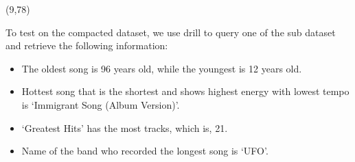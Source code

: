 \documentclass[hyperref={pdfpagelabels=false}]{beamer}
\begin{document}
\begin{frame}


\begin{textblock}{40}(9,78)
	\begin{basebox}[title=Basic Data Analysis,opacitybacktitle=.45,colframe=green!65!black,colbacktitle=green!10, halign title=left]
		To test on the compacted dataset, we use drill to query one of the sub dataset and retrieve the following information: 
		\vspace{0.3 cm}
		\begin{itemize}
		\item The oldest song is 96 years old, while the youngest is 12 years old.
		\item Hottest song that is the shortest and shows highest energy with lowest tempo is `Immigrant Song (Album Version)'. 
		\item `Greatest Hits' has the most tracks, which is, 21. 
		\item Name of the band who recorded the longest song is `UFO'. 
		\end{itemize}
	\end{basebox}
\end{textblock}




\end{frame}
\end{document}
